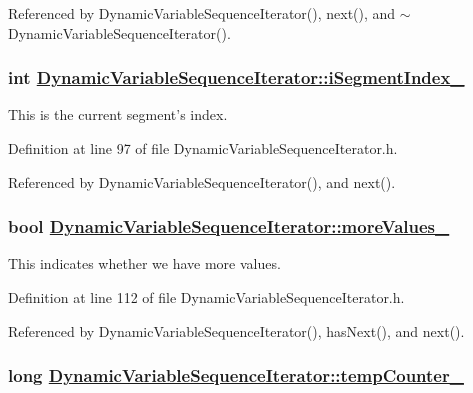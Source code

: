 Referenced by Dynamic\-Variable\-Sequence\-Iterator(), next(), and $\sim$Dynamic\-Variable\-Sequence\-Iterator().\hypertarget{classDynamicVariableSequenceIterator_r1}{
\subsubsection[iSegmentIndex\_\-]{\setlength{\rightskip}{0pt plus 5cm}int \hyperlink{classDynamicVariableSequenceIterator_r1}{Dynamic\-Variable\-Sequence\-Iterator::i\-Segment\-Index\_\-}}}
\label{classDynamicVariableSequenceIterator_r1}


This is the current segment's index. 

Definition at line 97 of file Dynamic\-Variable\-Sequence\-Iterator.h.

Referenced by Dynamic\-Variable\-Sequence\-Iterator(), and next().\hypertarget{classDynamicVariableSequenceIterator_r4}{
\subsubsection[moreValues\_\-]{\setlength{\rightskip}{0pt plus 5cm}bool \hyperlink{classDynamicVariableSequenceIterator_r4}{Dynamic\-Variable\-Sequence\-Iterator::more\-Values\_\-}}}
\label{classDynamicVariableSequenceIterator_r4}


This indicates whether we have more values. 

Definition at line 112 of file Dynamic\-Variable\-Sequence\-Iterator.h.

Referenced by Dynamic\-Variable\-Sequence\-Iterator(), has\-Next(), and next().\hypertarget{classDynamicVariableSequenceIterator_r5}{
\subsubsection[tempCounter\_\-]{\setlength{\rightskip}{0pt plus 5cm}long \hyperlink{classDynamicVariableSequenceIterator_r5}{Dynamic\-Variable\-Sequence\-Iterator::temp\-Counter\_\-}}}
\label{classDynamicVariableSequenceIterator_r5}




